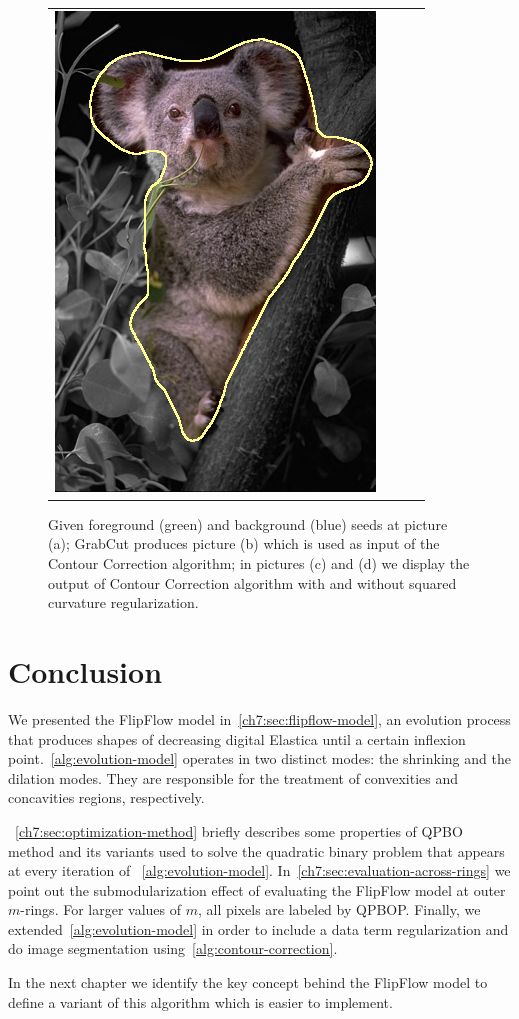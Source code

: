 \begin{figure}
\begin{tabular}{cccc}
 	\includegraphics[scale=0.25]{figures/chapter6/segmentation/coala/mt_improve/radius_5/data_0.50/sq_1.00/length_0.50/it_50/corrected-seg.png}
\end{tabular}	
\caption{Given foreground (green) and background (blue) seeds at picture (a); GrabCut produces picture (b) which is used as input of the Contour Correction algorithm; in pictures (c) and (d) we display the output of Contour Correction algorithm with and without squared curvature regularization. }
\label{fig:ch6-segmentation}
\end{figure}

\section{Conclusion}
\label{ch7:sec:conclusion}
We presented the FlipFlow model in~\cref{ch7:sec:flipflow-model}, an evolution process that produces shapes of decreasing digital Elastica until a certain inflexion point.~\cref{alg:evolution-model} operates in two distinct modes: the shrinking and the dilation modes. They are responsible for the treatment of convexities and concavities regions, respectively. 


~\cref{ch7:sec:optimization-method} briefly describes some properties of QPBO method and its variants used to solve the quadratic binary problem that appears at every iteration of ~\cref{alg:evolution-model}. In~\cref{ch7:sec:evaluation-across-rings} we point out the submodularization effect of evaluating the FlipFlow model at outer $m$-rings. For larger values of $m$, all pixels are labeled by QPBOP. Finally, we extended~\cref{alg:evolution-model} in order to include a data term regularization and do image segmentation using~\cref{alg:contour-correction}.


In the next chapter we identify the key concept behind the FlipFlow model to define a variant of this algorithm which is easier to implement.


